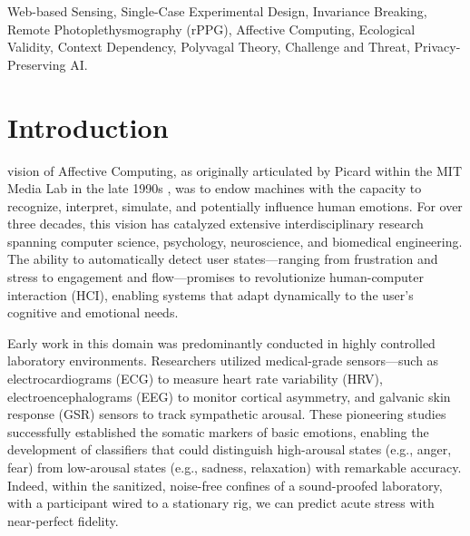 \documentclass[journal]{IEEEtran}
\begin{document}
\begin{abstract}
\textbf{\textit{Conclusion}}: These findings provide empirical support for the "Safe Haven" hypothesis, suggesting that familiar, 
safe environments act as powerful moderators of the autonomic nervous system, effectively buffering the impact of cognitive stressors. 
We discuss the profound implications of this "Invariance Breaking" for the design of next-generation ubiquitous computing systems, 
arguing that future affective models must be dynamically parameterized by the user's environmental context 
to avoid catastrophic misinterpretation of physiological signals.
\end{abstract}

\begin{IEEEkeywords}
Web-based Sensing, Single-Case Experimental Design, Invariance Breaking, Remote Photoplethysmography (rPPG), 
Affective Computing, Ecological Validity, Context Dependency, Polyvagal Theory, Challenge and Threat, Privacy-Preserving AI.
\end{IEEEkeywords}

\section{Introduction}

 vision of Affective Computing, as originally articulated by Picard within the MIT Media Lab in the late 1990s \cite{picard_affective_computing}, 
was to endow machines with the capacity to recognize, interpret, simulate, and potentially influence human emotions. 
For over three decades, this vision has catalyzed extensive interdisciplinary research spanning computer science, psychology, 
neuroscience, and biomedical engineering. The ability to automatically detect user states—ranging from frustration and stress 
to engagement and flow—promises to revolutionize human-computer interaction (HCI), enabling systems that adapt dynamically 
to the user's cognitive and emotional needs.

Early work in this domain was predominantly conducted in highly controlled laboratory environments. 
Researchers utilized medical-grade sensors—such as electrocardiograms (ECG) to measure heart rate variability (HRV), 
electroencephalograms (EEG) to monitor cortical asymmetry, and galvanic skin response (GSR) sensors to track sympathetic arousal. 
These pioneering studies successfully established the somatic markers of basic emotions, enabling the development of classifiers 
that could distinguish high-arousal states (e.g., anger, fear) from low-arousal states (e.g., sadness, relaxation) with remarkable accuracy. 
Indeed, within the sanitized, noise-free confines of a sound-proofed laboratory, with a participant wired to a stationary rig, 
we can predict acute stress with near-perfect fidelity.
\end{document}
